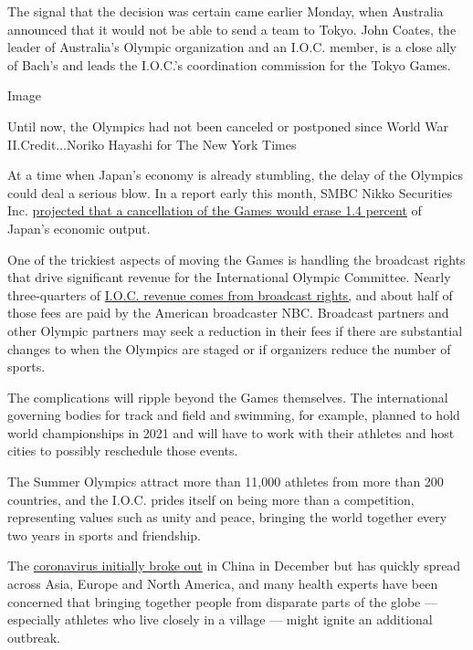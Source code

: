 The signal that the decision was certain came earlier Monday, when
Australia announced that it would not be able to send a team to Tokyo.
John Coates, the leader of Australia's Olympic organization and an
I.O.C. member, is a close ally of Bach's and leads the I.O.C.'s
coordination commission for the Tokyo Games.

Image

Until now, the Olympics had not been canceled or postponed since World
War II.Credit...Noriko Hayashi for The New York Times

At a time when Japan's economy is already stumbling, the delay of the
Olympics could deal a serious blow. In a report early this month, SMBC
Nikko Securities Inc.
\href{https://www.japantimes.co.jp/news/2020/03/07/business/economy-business/canceling-tokyo-olympics-gdp/\#.XnkU59NKiYU}{projected
that a cancellation of the Games would erase 1.4 percent} of Japan's
economic output.

One of the trickiest aspects of moving the Games is handling the
broadcast rights that drive significant revenue for the International
Olympic Committee. Nearly three-quarters of
\href{https://stillmed.olympic.org/media/Document\%20Library/OlympicOrg/Documents/IOC-Marketing-and-Broadcasting-General-Files/Olympic-Marketing-Fact-File-2018.pdf}{I.O.C.
revenue comes from broadcast rights,} and about half of those fees are
paid by the American broadcaster NBC. Broadcast partners and other
Olympic partners may seek a reduction in their fees if there are
substantial changes to when the Olympics are staged or if organizers
reduce the number of sports.

The complications will ripple beyond the Games themselves. The
international governing bodies for track and field and swimming, for
example, planned to hold world championships in 2021 and will have to
work with their athletes and host cities to possibly reschedule those
events.

The Summer Olympics attract more than 11,000 athletes from more than 200
countries, and the I.O.C. prides itself on being more than a
competition, representing values such as unity and peace, bringing the
world together every two years in sports and friendship.

The
\href{https://www.nytimes.com/interactive/2020/03/22/world/coronavirus-spread.html}{coronavirus
initially broke out} in China in December but has quickly spread across
Asia, Europe and North America, and many health experts have been
concerned that bringing together people from disparate parts of the
globe --- especially athletes who live closely in a village --- might
ignite an additional outbreak.

